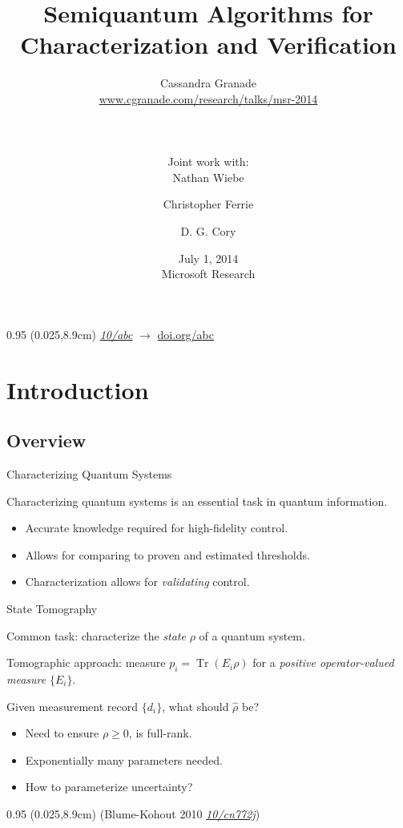 \documentclass[xcolor=dvipsnames, compress]{beamer}
\title{Semiquantum Algorithms for Characterization and Verification}
\author[Granade, Wiebe, Ferrie and Cory]{
  Cassandra Granade  \\
  {\tiny \url{www.cgranade.com/research/talks/msr-2014}} \\
  \rule{0.35\textwidth}{0.125pt}\\
  {\footnotesize Joint work with:}\\
  Nathan Wiebe \and
  Christopher Ferrie \and
  D. G. Cory
}
\institute[IQC]{
  Institute for Quantum Computing\\
  University of Waterloo, Ontario, Canada
}
\date[July 2014]{
  July 1, 2014 \\
  {\footnotesize Microsoft Research}
}
\renewcommand\UrlFont{\color{red}\rmfamily\itshape}
\newcommand{\shortdoi}[1]{\href{http://doi.org/#1}{\UrlFont 10/#1}}
\newcommand{\Tr}{\operatorname{Tr}}
\newcommand{\bottomnote}[1]{
  \begin{textblock*}{0.95\paperwidth} (0.025\paperwidth,8.9cm)
    {\tiny \hfill #1}
  \end{textblock*}
}
\begin{document}
\begin{frame}[plain]
  \titlepage
  \bottomnote{\shortdoi{abc} $\to$ \url{doi.org/abc}} 
\end{frame}

\section{Introduction}
\subsection{Overview}

\begin{frame}{Characterizing Quantum Systems}

  Characterizing quantum systems is an essential task in quantum information.

  \begin{itemize}
    \item Accurate knowledge required for high-fidelity control.
    \item Allows for comparing to proven and estimated thresholds.
    \item Characterization allows for \emph{validating} control.
  \end{itemize}

\end{frame}

\begin{frame}{State Tomography}

  Common task: characterize the \emph{state} $\rho$ of a quantum system.

  Tomographic approach: measure $p_i = \Tr(E_i\rho)$ for a \emph{positive operator-valued measure}
  $\{E_i\}$.


  Given measurement record $\{d_i\}$, what should $\hat{\rho}$ be?

  \begin{itemize}
    \item Need to ensure $\rho \ge 0$, is full-rank.
    \item Exponentially many parameters needed.
    \item How to parameterize uncertainty?
  \end{itemize}

  \bottomnote{(Blume-Kohout 2010 \shortdoi{cn772j})}

\end{frame}
\end{document}
